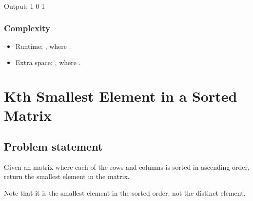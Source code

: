 \documentclass[letterpaper,12pt,english]{book}
\begin{document}
\begin{sphinxVerbatim}[commandchars=\\\{\}]
Output:
1
0
1
\end{sphinxVerbatim}


\subsubsection{Complexity}
\label{\detokenize{Priority_Queue/1354_Construct_Target_Array_With_Multiple_Sums:id3}}\begin{itemize}
\item {} 
\sphinxAtStartPar
Runtime: , where .

\item {} 
\sphinxAtStartPar
Extra space: , where .

\end{itemize}

\sphinxstepscope


\section{Kth Smallest Element in a Sorted Matrix}
\label{\detokenize{Priority_Queue/378_Kth_Smallest_Element_in_a_Sorted_Matrix:kth-smallest-element-in-a-sorted-matrix}}\label{\detokenize{Priority_Queue/378_Kth_Smallest_Element_in_a_Sorted_Matrix::doc}}

\subsection{Problem statement\sphinxfootnotemark[60]}
\label{\detokenize{Priority_Queue/378_Kth_Smallest_Element_in_a_Sorted_Matrix:problem-statement}}%
\begin{footnotetext}[60]\sphinxAtStartFootnote
{}
%
\end{footnotetext}\ignorespaces 
\sphinxAtStartPar
Given an  matrix where each of the rows and columns is sorted in ascending order, return the  smallest element in the matrix.

\sphinxAtStartPar
Note that it is the  smallest element in the sorted order, not the  distinct element.
\end{document}
